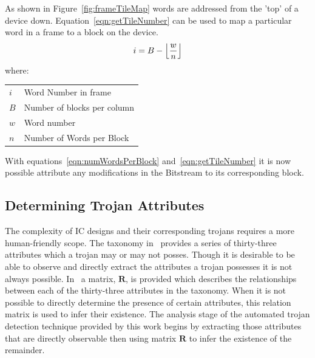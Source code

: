 \documentclass[conference]{IEEEtran}
\makeatletter
\newcommand{\ConditionSize}{\footnotesize}
\DeclarePairedDelimiter\floor{\lfloor}{\rfloor}
\newenvironment{conditions}
{\par\vspace{\abovedisplayskip}\noindent\begin{tabular}{>{$}l<{$} @{${}={}$} l}}
	{\end{tabular}\par\vspace{\belowdisplayskip}}
\makeatother
\begin{document}
\normalsize
As shown in Figure~\ref{fig:frameTileMap} words are addressed from the 'top' of a device down.
Equation~\ref{eqn:getTileNumber} can be used to map a particular word in a frame to a block on the device.
\begin{equation} \label{eqn:getTileNumber}
i = B - \floor*{\frac{w}{n}}
\end{equation}
\ConditionSize
where:
\begin{conditions}
	i     &  Word Number in frame\\
	B     &  Number of blocks per column \\
	w     &  Word number \\
	n     &  Number of Words per Block 
\end{conditions}
\normalsize
With equations~\ref{eqn:numWordsPerBlock} and~\ref{eqn:getTileNumber} it is now possible attribute any modifications in the \gls{Bitstream} to its corresponding block.

\subsection{Determining Trojan Attributes} \label{sec:trojanAttributes}
The complexity of \acrlong{IC} designs and their corresponding trojans requires a more human-friendly scope.
The taxonomy in~\cite{samerAttribute} provides a series of thirty-three attributes which a trojan may or may not posses.
Though it is desirable to be able to observe and directly extract the attributes a trojan possesses it is not always possible. 
In~\cite{samerAttribute} a matrix, $\mathbf{R}$, is provided which describes the relationships between each of the thirty-three attributes in the taxonomy.
When it is not possible to directly determine the presence of certain attributes, this relation matrix is used to infer their existence.
The analysis stage of the automated trojan detection technique provided by this work begins by extracting those attributes that are directly observable then using matrix $\mathbf{R}$ to infer the existence of the remainder. 
\end{document}
